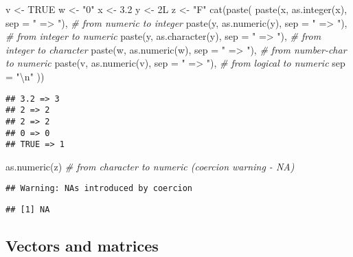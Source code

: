 \documentclass[
  oneside]{book}
\newenvironment{Shaded}{\begin{snugshade}}{\end{snugshade}}
\newcommand{\AttributeTok}[1]{\textcolor[rgb]{0.77,0.63,0.00}{#1}}
\newcommand{\CommentTok}[1]{\textcolor[rgb]{0.56,0.35,0.01}{\textit{#1}}}
\newcommand{\ConstantTok}[1]{\textcolor[rgb]{0.00,0.00,0.00}{#1}}
\newcommand{\FloatTok}[1]{\textcolor[rgb]{0.00,0.00,0.81}{#1}}
\newcommand{\FunctionTok}[1]{\textcolor[rgb]{0.00,0.00,0.00}{#1}}
\newcommand{\NormalTok}[1]{#1}
\newcommand{\OtherTok}[1]{\textcolor[rgb]{0.56,0.35,0.01}{#1}}
\newcommand{\SpecialCharTok}[1]{\textcolor[rgb]{0.00,0.00,0.00}{#1}}
\newcommand{\StringTok}[1]{\textcolor[rgb]{0.31,0.60,0.02}{#1}}
\begin{document}
\begin{Shaded}
\begin{Highlighting}[]
\NormalTok{v }\OtherTok{\textless{}{-}} \ConstantTok{TRUE}
\NormalTok{w }\OtherTok{\textless{}{-}} \StringTok{"0"}
\NormalTok{x }\OtherTok{\textless{}{-}} \FloatTok{3.2}
\NormalTok{y }\OtherTok{\textless{}{-}}\NormalTok{ 2L}
\NormalTok{z }\OtherTok{\textless{}{-}} \StringTok{"F"}
\FunctionTok{cat}\NormalTok{(}\FunctionTok{paste}\NormalTok{(}
  \FunctionTok{paste}\NormalTok{(x, }\FunctionTok{as.integer}\NormalTok{(x), }\AttributeTok{sep =} \StringTok{" =\textgreater{} "}\NormalTok{), }\CommentTok{\# from numeric to integer}
  \FunctionTok{paste}\NormalTok{(y, }\FunctionTok{as.numeric}\NormalTok{(y), }\AttributeTok{sep =} \StringTok{" =\textgreater{} "}\NormalTok{), }\CommentTok{\# from integer to numeric}
  \FunctionTok{paste}\NormalTok{(y, }\FunctionTok{as.character}\NormalTok{(y), }\AttributeTok{sep =} \StringTok{" =\textgreater{} "}\NormalTok{),  }\CommentTok{\# from integer to character}
  \FunctionTok{paste}\NormalTok{(w, }\FunctionTok{as.numeric}\NormalTok{(w), }\AttributeTok{sep =} \StringTok{" =\textgreater{} "}\NormalTok{),  }\CommentTok{\# from number{-}char to numeric}
  \FunctionTok{paste}\NormalTok{(v, }\FunctionTok{as.numeric}\NormalTok{(v), }\AttributeTok{sep =} \StringTok{" =\textgreater{} "}\NormalTok{), }\CommentTok{\# from logical to numeric}
  \AttributeTok{sep =} \StringTok{"}\SpecialCharTok{\textbackslash{}n}\StringTok{"}
\NormalTok{))}
\end{Highlighting}
\end{Shaded}

\begin{verbatim}
## 3.2 => 3
## 2 => 2
## 2 => 2
## 0 => 0
## TRUE => 1
\end{verbatim}

\begin{Shaded}
\begin{Highlighting}[]
\FunctionTok{as.numeric}\NormalTok{(z)  }\CommentTok{\# from character to numeric (coercion warning {-} NA)}
\end{Highlighting}
\end{Shaded}

\begin{verbatim}
## Warning: NAs introduced by coercion
\end{verbatim}

\begin{verbatim}
## [1] NA
\end{verbatim}

\hypertarget{vectors-and-matrices}{%
\subsection{Vectors and matrices}\label{vectors-and-matrices}}
\end{document}
